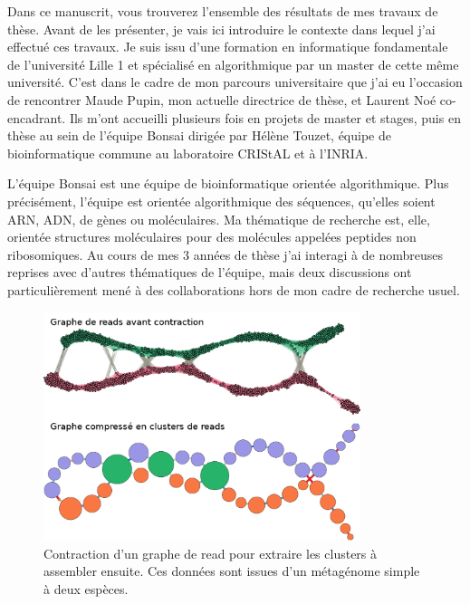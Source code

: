 Dans ce manuscrit, vous trouverez l'ensemble des résultats de mes travaux de thèse.
Avant de les présenter, je vais ici introduire le contexte dans lequel j'ai effectué ces travaux.
Je suis issu d'une formation en informatique fondamentale de l'université Lille 1 et spécialisé en algorithmique par un master de cette même université.
C'est dans le cadre de mon parcours universitaire que j'ai eu l'occasion de rencontrer Maude Pupin, mon actuelle directrice de thèse, et Laurent Noé co-encadrant.
Ils m'ont accueilli plusieurs fois en projets de master et stages, puis en thèse au sein de l'équipe Bonsai dirigée par Hélène Touzet, équipe de bioinformatique commune au laboratoire CRIStAL et à l'INRIA.

L'équipe Bonsai est une équipe de bioinformatique orientée algorithmique.
Plus précisément, l'équipe est orientée algorithmique des séquences, qu'elles soient ARN, ADN, de gènes ou moléculaires.
Ma thématique de recherche est, elle, orientée structures moléculaires pour des molécules appelées peptides non ribosomiques.
Au cours de mes 3 années de thèse j'ai interagi à de nombreuses reprises avec d'autres thématiques de l'équipe, mais deux discussions ont particulièrement mené à des collaborations hors de mon cadre de recherche usuel.

\begin{figure}[!ht]
  \begin{center}
    \includegraphics[width=350px]{Figures/preambule/pierre.png}
    \caption{\label{pierre}Contraction d'un graphe de read pour extraire les clusters à assembler ensuite.
    Ces données sont issues d'un métagénome simple à deux espèces.}
  \end{center}
\end{figure}

